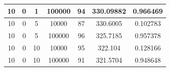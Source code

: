 \documentclass[11pt,a4paper]{report}
\begin{document}
\begin{table}[H]
{\begin{tabular}{c|c|c|c|c|c|c}
10                                                                                   & 0                                                                                      & 1                                                                          & 100000                                                                    & 94                                                                                        & 330.09882                                                                 & 0.966469              \\ \hline
10                                                                                   & 0                                                                                      & 5                                                                          & 10000                                                                     & 87                                                                                        & 330.6005                                                                  & 0.102783              \\
10                                                                                   & 0                                                                                      & 5                                                                          & 100000                                                                    & 96                                                                                        & 325.7185                                                                  & 0.957378              \\ \hline
10                                                                                   & 0                                                                                      & 10                                                                         & 10000                                                                     & 95                                                                                        & 322.104                                                                   & 0.128166              \\
10                                                                                   & 0                                                                                      & 10                                                                         & 100000                                                                    & 91                                                                                        & 321.5704                                                                  & 0.948648              \\ \hline

\end{tabular}}
\end{table}
\end{document}
